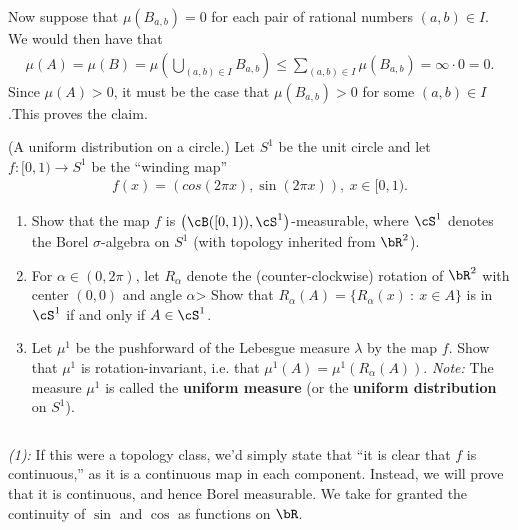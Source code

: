 \begin{homework}[e]
\begin{prf}
		Now suppose that $\mu(B_{a,b}) = 0$ for each pair of rational numbers $(a,b) \in I$. We would then have that
		\begin{align*}
			\mu(A) = \mu(B) = \mu\left(\bigcup_{(a,b) \in I} B_{a,b}\right) \leq \sum_{(a,b) \in I} \mu(B_{a,b}) = \infty \cdot 0 = 0.
		\end{align*}
		Since $\mu(A) > 0$, it must be the case that $\mu(B_{a,b}) > 0$ for some $(a,b) \in I$.This proves the claim.
	\end{prf}
	 (A uniform distribution on a circle.) Let $S^1$ be the unit circle and let $f:[0,1) \to S^1$ be the ``winding map''
	\begin{align*}
		f(x) = \left(cos(2\pi x),\sin(2\pi x)\right), ~ x\in [0,1).
	\end{align*}
	\begin{enumerate}[(1)]
		\item Show that the map $f$ is $\big(\cB([0,1)), \cS^1\big)$-measurable, where $\cS^1$ denotes the Borel $\sigma$-algebra on $S^1$ (with topology inherited from $\bR^2$).
		\item For $\alpha \in (0,2\pi)$, let $R_\alpha$ denote the (counter-clockwise) rotation of $\bR^2$ with center $(0,0)$ and angle $\alpha$> Show that $R_\alpha(A) = \{R_\alpha(x) ~ : ~ x \in A\}$  is in $\cS^1$ if and only if $A \in \cS^1$.
		\item Let $\mu^1$ be the pushforward of the Lebesgue measure $\lambda$ by the map $f$. Show that $\mu^1$ is rotation-invariant, i.e. that $\mu^1(A) = \mu^1(R_\alpha(A))$. \small{\emph{Note:} The measure $\mu^1$ is called the \textbf{uniform measure} (or the \textbf{uniform distribution} on $S^1$)}.
	\end{enumerate}
	\begin{prf}$ $

		\noindent \emph{(1):} \hspace{0.5em} If this were a topology class, we'd simply state that ``it is clear that $f$ is continuous,'' as it is a continuous map in each component. Instead, we will prove that it is continuous, and hence Borel measurable. We take for granted the continuity of $\sin$ and $\cos$ as functions on $\bR$.


\end{prf}
\end{homework}

